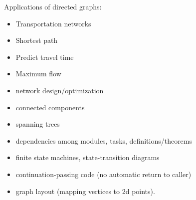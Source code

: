 \documentclass[11pt,openany]{book}
\begin{document}
Applications of directed graphs:~\cite{clrs_2009}
\begin{itemize}
  \item Transportation networks
  \item Shortest path
  \item Predict travel time
  \item Maximum flow
  \item network design/optimization
  \item connected components
  \item spanning trees
  \item dependencies among modules, tasks, definitions/theorems
  \item finite state machines, state-transition diagrams
  \item continuation-passing code (no automatic return to caller)
  \item graph layout (mapping vertices to $2$d points).
\end{itemize}

\label{sec:Category_from_digraph}

\end{document}

